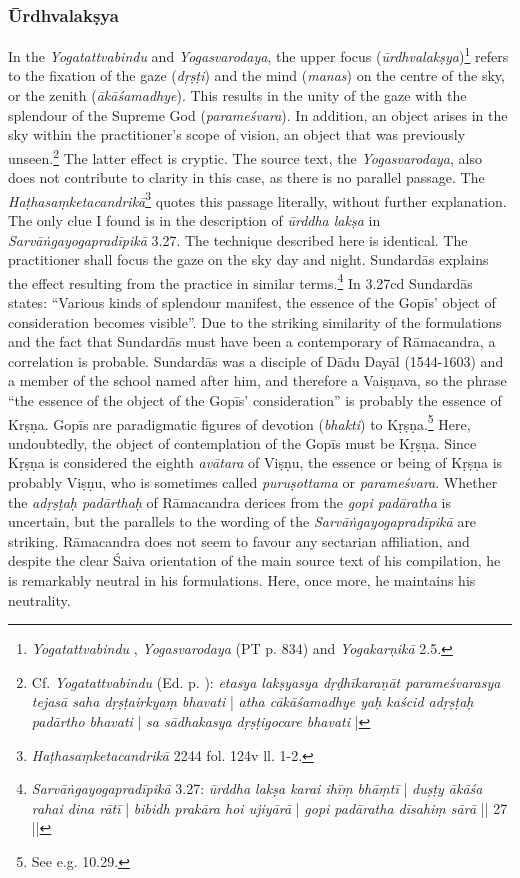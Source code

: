 \subsubsection{Ūrdhvalakṣya}
In the \textit{Yogatattvabindu} and \textit{Yogasvarodaya}, the upper focus (\textit{ūrdhvalakṣya})\footnote{\emph{Yogatattvabindu} , \emph{Yogasvarodaya} (PT p. 834) and \emph{Yogakarṇikā} 2.5.} refers to the fixation of the gaze (\textit{dṛṣṭi}) and the mind (\textit{manas}) on the centre of the sky, or the zenith (\textit{ākāśamadhye}). This results in the unity of the gaze with the splendour of the Supreme God (\textit{parameśvara}). In addition, an object arises in the sky within the practitioner’s scope of vision, an object that was previously unseen.\footnote{Cf. \textit{Yogatattvabindu}  (Ed. p. \pageref{urdhvalaksya}): \textit{etasya lakṣyasya dṛḍhīkaraṇāt parameśvarasya tejasā saha dṛṣṭairkyaṃ bhavati} | \textit{atha cākāśamadhye yaḥ kaścid adṛṣṭaḥ padārtho bhavati} | \textit{sa sādhakasya dṛṣṭigocare bhavati} |} The latter effect is cryptic. The source text, the \textit{Yogasvarodaya}, also does not contribute to clarity in this case, as there is no parallel passage. The \textit{Haṭhasaṃketacandrikā}\footnote{\textit{Haṭhasaṃketacandrikā} 2244 fol. 124v ll. 1-2.} quotes this passage literally, without further explanation. The only clue I found is in the description of \textit{ūrddha lakṣa} in \textit{Sarvāṅgayogapradīpikā} 3.27. The technique described here is identical. The practitioner shall focus the gaze on the sky day and night. Sundardās explains the effect resulting from the practice in similar terms.\footnote{\textit{Sarvāṅgayogapradīpikā} 3.27: \textit{ūrddha lakṣa karai ihīṃ bhāṃtī} | \textit{duṣṭy ākāśa rahai dina rātī} | \textit{bibidh prakāra hoi ujiyārā} | \textit{gopi padāratha dīsahiṃ sārā} || 27 ||} In 3.27cd Sundardās states: ``Various kinds of splendour manifest, the essence of the Gopīs' object of consideration becomes visible''. Due to the striking similarity of the formulations and the fact that Sundardās must have been a contemporary of Rāmacandra, a correlation is probable. Sundardās was a disciple of Dādu Dayāl (1544-1603) and a member of the school named after him, and therefore a Vaiṣṇava, so the phrase ``the essence of the object of the Gopīs’ consideration'' is probably the essence of Krṣṇa. Gopīs are paradigmatic figures of devotion (\textit{bhakti}) to Kṛṣṇa.\footnote{See e.g.  10.29.} Here, undoubtedly, the object of contemplation of the Gopīs must be Kṛṣṇa. Since Kṛṣṇa is considered the eighth \textit{avātara} of Viṣṇu, the essence or being of Kṛṣṇa is probably Viṣṇu, who is sometimes called \textit{puruṣottama} or \textit{parameśvara}. Whether the \textit{adṛṣṭaḥ padārthaḥ} of Rāmacandra derices from the \textit{gopi padāratha} is uncertain, but the parallels to the wording of the \textit{Sarvāṅgayogapradīpikā} are striking. Rāmacandra does not seem to favour any sectarian affiliation, and despite the clear Śaiva orientation of the main source text of his compilation, he is remarkably neutral in his formulations. Here, once more, he maintains his neutrality.

